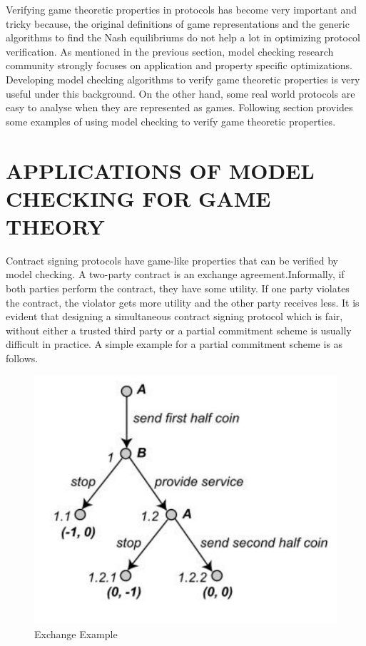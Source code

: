 
Verifying game theoretic properties in protocols has become very important and tricky because, the original definitions of game representations and the generic algorithms to find the Nash equilibriums do not help a lot in optimizing protocol verification. As mentioned in the previous section, model checking research community strongly focuses on application and property specific optimizations. Developing model checking algorithms to verify game theoretic properties is very useful under this background. 
\newline
On the other hand, some real world protocols are easy to analyse when they are represented as games. Following section provides some examples of using model checking to verify game theoretic properties.
\newline

\section{APPLICATIONS OF MODEL CHECKING FOR GAME THEORY}

Contract signing protocols have game-like properties that can be verified by model checking. A two-party contract is an exchange agreement.Informally, if both parties perform the contract, they have some utility. If one party violates the contract, the violator gets more utility and the other party receives less. It is evident that designing a simultaneous contract signing protocol which is fair, without either a trusted third party or a partial commitment scheme is usually difficult in practice.\cite{Ben-Or1990} A simple example for a partial commitment scheme is as follows.

\begin{figure}[H]
	\centering
	\includegraphics[width=\textwidth]{non_zero_sum3}
	\caption{Exchange Example}
	\label{fig:contract_example}
\end{figure}

